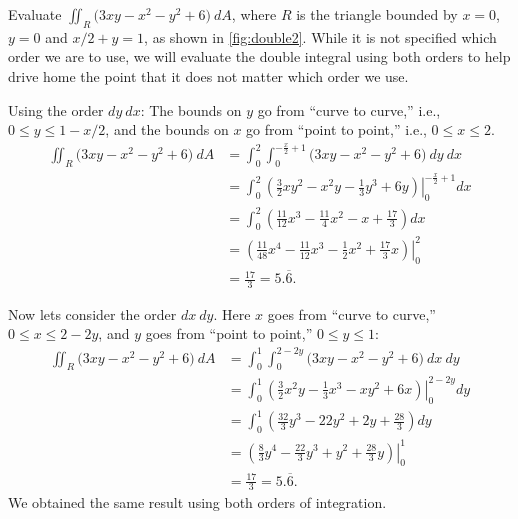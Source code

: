 \begin{example}\label{ex_double2}
Evaluate $\iint_R \big(3xy-x^2-y^2+6\big)\ dA$, where $R$ is the triangle bounded by $x=0$, $y=0$ and $x/2+y=1$, as shown in \autoref{fig:double2}.
\solution
While it is not specified which order we are to use, we will evaluate the double integral using both orders to help drive home the point that it does not matter which order we use.


Using the order $dy\ dx$:
The bounds on $y$ go from ``curve to curve,'' i.e., $0\leq y\leq 1-x/2$, and the bounds on $x$ go from ``point to point,'' i.e., $0\leq x\leq 2$.
\begin{align*}
\iint_R (3xy-x^2-y^2+6\big)\ dA &= \int_0^2\int_0^{-\frac x2+1} (3xy-x^2-y^2+6\big)\ dy\ dx\\
		&= \int_0^2\left.\left(\frac32xy^2-x^2y-\frac13y^3+6y\right)\right|_0^{-\frac x2+1}dx\\
		&= \int_0^2 \left(\frac{11}{12}x^3-\frac{11}{4}x^2-x+\frac{17}3\right)dx \\
		&= \left.\left(\frac{11}{48}x^4-\frac{11}{12}x^3-\frac12x^2+\frac{17}3x\right)\right|_0^2\\
		&= \frac{17}3=5.\overline{6}.
\end{align*}

Now lets consider the order $dx \ dy$. Here $x$ goes from ``curve to curve,'' $0\leq x\leq 2-2y$, and $y$ goes from ``point to point,'' $0\leq y\leq 1$:
\begin{align*}
\iint_R (3xy-x^2-y^2+6\big)\ dA &= \int_0^1\int_0^{2-2y} (3xy-x^2-y^2+6\big)\ dx\ dy\\
		&= \int_0^1\left.\left(\frac32x^2y-\frac13x^3-xy^2+6x\right)\right|_0^{2-2y} dy\\
		&= \int_0^1\left(\frac{32}3y^3-22y^2+2y+\frac{28}3\right)dy\\
		&=\left.\left(\frac83y^4-\frac{22}3y^3+y^2+\frac{28}3y\right)\right|_0^1\\
		&=\frac{17}3=5.\overline{6}.
\end{align*}
We obtained the same result using both orders of integration.
\end{example}

